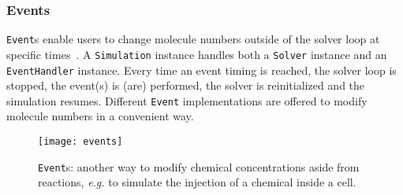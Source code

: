 \subsubsection{Events}

\texttt{Event}s enable users to change molecule numbers outside of the solver loop at specific times~. A \texttt{Simulation} instance handles both a \texttt{Solver} instance and an \texttt{EventHandler} instance. Every time an event timing is reached, the solver loop is stopped, the event(s) is (are) performed, the solver is reinitialized and the simulation resumes. Different \texttt{Event} implementations are offered to modify molecule numbers in a convenient way.

\begin{figure}[!h]
  \centering
  \texttt{[image: events]}
  \caption{\texttt{Event}s: another way to modify chemical concentrations aside from reactions, \textit{e.g.} to simulate the injection of a chemical inside a cell.}
  \label{fig:events}
\end{figure}
